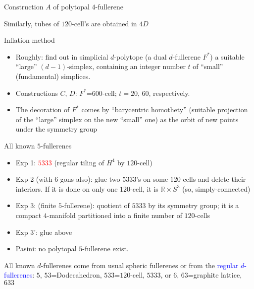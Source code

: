\documentclass[%
pdf,
colorBG,
slideColor,
]{prosper}
\begin{document}
\begin{slide}{Construction $A$ of polytopal $4$-fullerene}
\vspace{-3mm}
\begin{center}
\end{center}
\begin{center}
Similarly, tubes of $120$-cell's are obtained in $4D$
\end{center}

\end{slide}




\begin{slide}{Inflation method}
\begin{itemize}
\item Roughly: find out in simplicial $d$-polytope (a dual $d$-fullerene $F^*$)
a suitable ``large'' $(d-1)$-simplex, containing an integer number $t$ of ``small'' (fundamental) simplices.
\item Constructions $C$, $D$: $F^*$=$600$-cell; $t=20$, $60$, respectively.
\item The decoration of $F^*$ comes by ``barycentric homothety'' (suitable projection of the ``large'' simplex on the new ``small'' one) as the orbit of new points under the symmetry group
\end{itemize}


\end{slide}




\begin{slide}{All known $5$-fullerenes}
\begin{itemize}
\item Exp 1: \textcolor{red}{$5333$} (regular tiling of $H^4$ by $120$-cell)

\item Exp 2 (with $6$-gons also): glue two $5333$'s on some
$120$-cells and delete their interiors. If it is done on
only one $120$-cell, it is $ \mathbb{R} \times S^3$
(so, simply-connected)

\item Exp 3: (finite $5$-fullerene): quotient of $5333$ by its symmetry group; it is a compact $4$-manifold partitioned into a finite number of $120$-cells

\item Exp 3': glue above

\item Pasini: no polytopal $5$-fullerene exist.
\end{itemize}
All known $d$-fullerenes come from usual spheric fullerenes or
from the \textcolor{blue}{regular $d$-fullerenes}: $5$,
$53$=Dodecahedron, $533$=$120$-cell, $5333$, or $6$, $63$=graphite
lattice, $633$
\end{slide}
\end{document}
